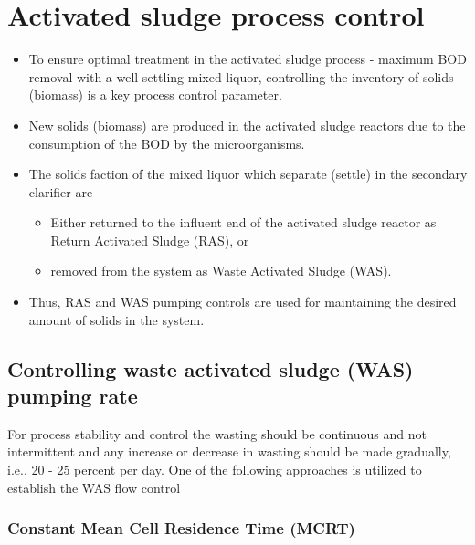 

		\section{Activated sludge process control}	


\begin{itemize}
\item To ensure optimal treatment in the activated sludge process - maximum BOD removal with a well settling mixed liquor, controlling the inventory of solids (biomass) is a key process control parameter.\\
\item New solids (biomass) are produced in the activated sludge reactors due to the consumption of the BOD by the microorganisms.
\item The solids faction of the mixed liquor which separate (settle) in the secondary clarifier are
\begin{itemize}
\item Either returned to the influent end of the activated sludge reactor as Return Activated Sludge (RAS), or
\item removed from the system as Waste Activated Sludge (WAS). 
\end{itemize}
\item Thus, RAS and WAS pumping controls are used for maintaining the desired amount of solids in the system.
\end{itemize}

		\subsection{Controlling waste activated sludge (WAS) pumping rate}	

For process stability and control the wasting should be continuous and not intermittent and any increase or decrease in wasting should be made gradually, i.e., 20 - 25 percent per day.  One of the following approaches is utilized to establish the WAS flow control 

		\subsubsection{Constant Mean Cell Residence Time (MCRT)}	


